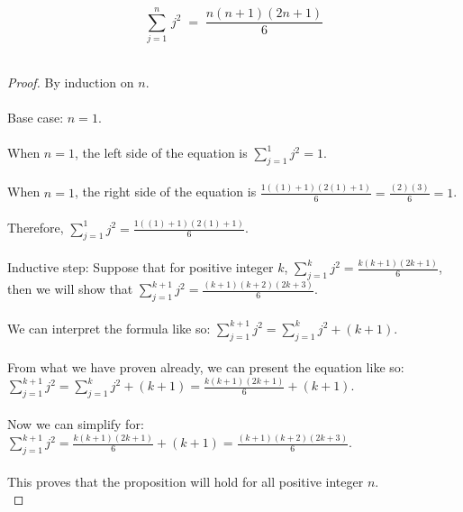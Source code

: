 \documentclass{amsart}
\theoremstyle{definition}
\theoremstyle{Exercise}
\theoremstyle{remark}
\theoremstyle{rule}
\numberwithin{equation}{section}
\begin{document}
\begin{enumerate}[label=(\alph*)]
   \[\displaystyle \sum_{j=1}^{n}\, j^2 \;=\;\frac{n(n+1)(2n+1)}{6}\]
    \\
    \begin{proof}
    By induction on $n$.\\\\
    Base case: $n=1$.\\\\
    When $n=1$, the left side of the equation is $\sum_{j=1}^{1} j^2 = 1$.\\\\
    When $n=1$, the right side of the equation is $\frac{1((1)+1)(2(1)+1)}{6} = \frac{(2)(3)}{6} = 1$.\\\\
    Therefore, $\sum_{j=1}^{1} j^2 = \frac{1((1)+1)(2(1)+1)}{6}$.\\
    \\
    Inductive step: Suppose that for positive integer $k$, $\sum_{j=1}^{k} j^2 = \frac{k(k+1)(2k+1)}{6}$, then we will show that $\sum_{j=1}^{k+1} j^2 = \frac{(k+1)(k+2)(2k+3)}{6}$.\\\\
    We can interpret the formula like so: $\sum_{j=1}^{k+1} j^2 = \sum_{j=1}^{k} j^2 + (k + 1)$.\\\\
    From what we have proven already, we can present the equation like so: $\sum_{j=1}^{k+1} j^2 = \sum_{j=1}^{k} j^2 + (k + 1) = \frac{k(k+1)(2k+1)}{6} + (k + 1)$.\\\\
    Now we can simplify for: $\sum_{j=1}^{k+1} j^2 = \frac{k(k+1)(2k+1)}{6} + (k + 1) = \frac{(k+1)(k+2)(2k+3)}{6}$.\\\\
    This proves that the proposition will hold for all positive integer $n$.\\ 
    \end{proof}
\end{enumerate}
\end{document}
